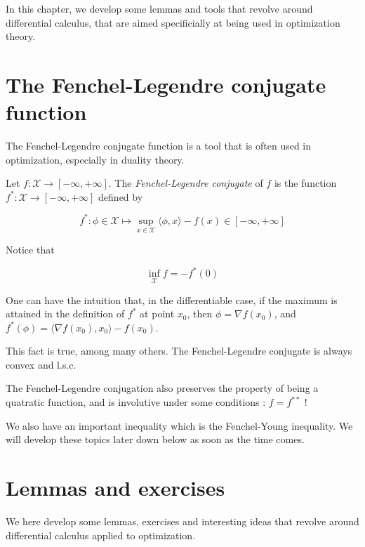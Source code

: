In this chapter, we develop some lemmas and tools that revolve around differential calculus, that are aimed specificially at being used in optimization theory.

\section{The Fenchel-Legendre conjugate function}

The Fenchel-Legendre conjugate function is a tool that is often used in optimization, especially in duality theory.

\begin{definition}
    Let $ f : \mathcal X \to [-\infty, +\infty] $. The \textit{Fenchel-Legendre conjugate} of $ f $ is the function $ f^* : \mathcal X \to [-\infty, +\infty] $ defined by

    \[ 
        f^* : \phi \in \mathcal X \mapsto \sup_{x \in \mathcal X} \langle \phi, x \rangle - f(x) \in [-\infty, +\infty]
    \]
\end{definition}

\begin{proposition}
    Notice that

    \[
        \inf_{\mathcal X} f = - f^*(0)
    \]
\end{proposition}

\begin{remark}
    One can have the intuition that, in the differentiable case, if the maximum is attained in the definition of $ f^* $ at point $ x_0 $, then $ \phi = \nabla f(x_0) $, and $ f^*(\phi) = \langle \nabla f(x_0), x_0 \rangle - f(x_0) $.

    This fact is true, among many others. The Fenchel-Legendre conjugate is always convex and l.s.c. 

    The Fenchel-Legendre conjugation also preserves the property of being a quatratic function, and is involutive under some conditions : $ f = f^{**} $ !

    We also have an important inequality which is the Fenchel-Young inequality. We will develop these topics later down below as soon as the time comes.
\end{remark}

\section{Lemmas and exercises}

We here develop some lemmas, exercises and interesting ideas that revolve around differential calculus applied to optimization.

